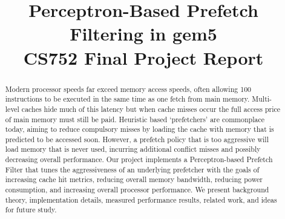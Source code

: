 \documentclass[10pt,conference]{IEEEtran}
\begin{document}
\title{Perceptron-Based Prefetch Filtering in gem5\\ CS752 Final Project Report}


\author{
\and
{}
}

\maketitle

\begin{abstract}
Modern processor speeds far exceed memory access speeds, often allowing 100 instructions to be executed in the same time as one fetch from main memory. Multi-level caches hide much of this latency but when cache misses occur the full access price of main memory must still be paid. Heuristic based `prefetchers' are commonplace today, aiming to reduce compulsory misses by loading the cache with memory that is predicted to be accessed soon. However, a prefetch policy that is too aggressive will load memory that is never used, incurring additional conflict misses and possibly decreasing overall performance. Our project implements a Perceptron-based Prefetch Filter that tunes the aggressiveness of an underlying prefetcher with the goals of increasing cache hit metrics, reducing overall memory bandwidth, reducing power consumption, and increasing overall processor performance. We present background theory, implementation details, measured performance results, related work, and ideas for future study. 
\end{abstract}
\end{document}
